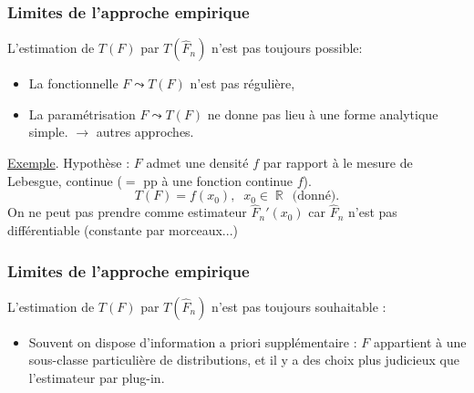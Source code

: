 ﻿\documentclass{beamer}
\DeclareMathOperator{\R}{{\mathbb R}}
\DeclareMathOperator{\bX}{\boldsymbol{X}}
\begin{document}
\begin{frame}
\frametitle{Limites de l'approche empirique} L'estimation de $T(F)$
par $T(\widehat F_n)$ n'est pas toujours {\color{red}possible}:
%
%
\begin{itemize}
\item La fonctionnelle $F \leadsto T(F)$ n'est pas \og régulière\fg{},
\item La paramétrisation $F \leadsto T(F)$ ne donne {\color{red}pas} lieu à une {\color{red}forme analytique simple}.
$\rightarrow$ autres approches.
\end{itemize}
%
\underline{Exemple}. {\color{red} Hypothèse} : $F$ admet une densité
$f$ par rapport à le mesure de Lebesgue, {\color{red}continue} ($=$
pp à une fonction continue $f$).
$$T(F) = f(x_0),\;\;x_0\in \R \,\;\text{(donné)}.$$
On ne {\color{red}peut pas prendre} comme estimateur $\widehat
F_n'(x_0)$ car $\widehat F_n$ n'est pas diff\'erentiable (constante
par morceaux...)

\end{frame}

\begin{frame}
\frametitle{Limites de l'approche empirique} L'estimation de $T(F)$
par $T(\widehat F_n)$ n'est pas toujours {\color{red}souhaitable} :
\begin{itemize}
\item
Souvent on dispose d'information {\color{red} a priori}
supplémentaire : $F$ appartient à une sous-classe {\color{red}
particulière} de distributions, et il y a des choix plus judicieux
que l'estimateur par plug-in.
\end{itemize}
\end{frame}
\end{document}
